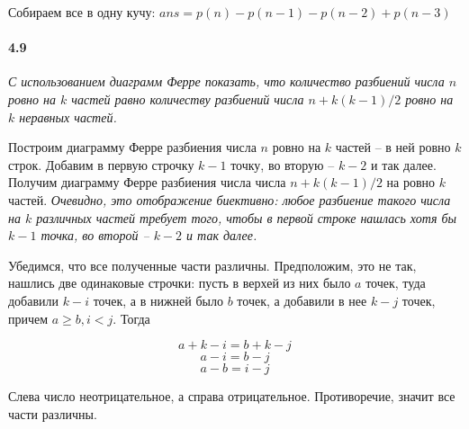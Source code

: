 \documentclass[russian]{article}
\begin{document}
Собираем все в одну кучу: $ans = p(n) - p(n-1) - p(n-2) + p(n-3)$


\paragraph*{4.9}

\textit{С использованием диаграмм Ферре показать, что количество разбиений числа $n$ ровно на $k$ частей равно количеству разбиений числа $n+k(k-1)/2$ ровно на $k$ неравных частей.}

Построим диаграмму Ферре разбиения числа $n$ ровно на $k$ частей -- в ней ровно $k$ строк. Добавим в первую строчку $k-1$ точку, во вторую -- $k-2$ и так далее. Получим диаграмму Ферре разбиения числа числа $n+k(k-1)/2$ на ровно $k$ частей. \textit{Очевидно, это отображение биективно: любое разбиение такого числа на $k$ различных частей требует того, чтобы в первой строке нашлась хотя бы $k-1$ точка, во второй -- $k-2$ и так далее.}

Убедимся, что все полученные части различны. Предположим, это не так, нашлись две одинаковые строчки: пусть в верхей из них было $a$ точек, туда добавили $k-i$ точек, а в нижней было $b$ точек, а добавили в нее $k-j$ точек, причем $a \geqslant b, i < j$. Тогда

\[
a + k - i = b + k - j
\]
\[
a - i = b - j
\]
\[
a - b = i - j
\]

Слева число неотрицательное, а справа отрицательное. Противоречие, значит все части различны.
\end{document}
